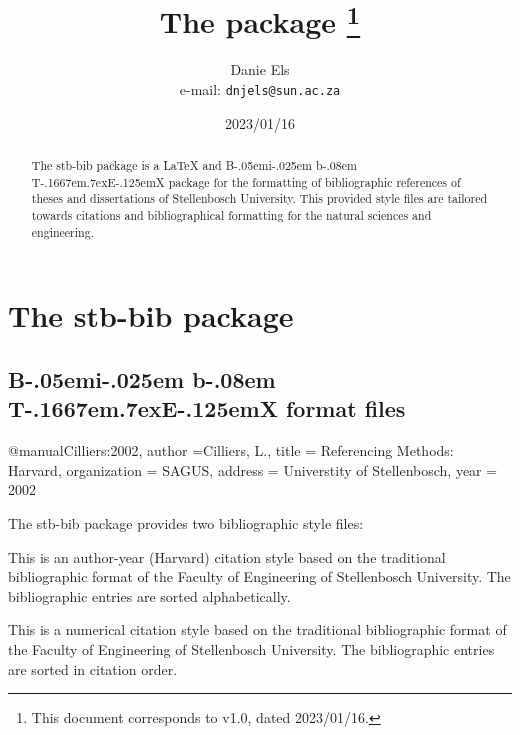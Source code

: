 \documentclass[a4paper,UKenglish]{article}
\title{The \STBbib{} package%
      \thanks{This document corresponds to \STBbib{} v1.0, dated 2023/01/16.}}
\author{Danie Els\\[1ex]
        \normalsize e-mail: \texttt{dnjels@sun.ac.za}}
\date{2023/01/16}
\makeatletter
\newlength{\mytab}
\newcommand*{\@tempfile}{\jobname.tmp}
\newcommand*{\bibfilename}{\jobname}
\def\@BibVerb{%
       \begingroup
          \@bsphack
          \immediate\openout \verbatim@out \@tempfile
          \let\do\@makeother\dospecials\catcode`\^^M\active
          \def\verbatim@processline{%
             \immediate\write\verbatim@out{\the\verbatim@line}%
             \immediate\write\bibtex@out{\the\verbatim@line}}%
          \verbatim@start}
\def\end@BibVerb{%
      \immediate\closeout\verbatim@out\@esphack
      \endgroup}
\newenvironment{BibVerb*}%
      {\@BibVerb}%
      {\end@BibVerb}
\newcommand{\Descriptionlabel}[1]{{#1}{ }\hfil}
\newenvironment{Description}[1][\hspace*{\mytab}]{%
      \list{}{%
         \setlength{\topsep}{\smallskipamount}%
         \setlength{\partopsep}{\z@skip}%
         \setlength{\parsep}{\z@skip}%
         \setlength{\itemsep}{\smallskipamount}%
         \setlength{\itemindent}{0pt}%
         \setlength{\labelsep}{0pt}%
         \settowidth{\labelwidth}{#1}%
         \setlength{\leftmargin}{\labelwidth}%
         \addtolength{\leftmargin}{\labelsep}%
         \addtolength{\leftmargin}{-\itemindent}%
         \let\makelabel\Descriptionlabel}%
      }{\endlist}
\newcommand*{\pkg}[1]{\textsf{#1}}
\def\BibTeX{{\rm B\kern-.05em{\sc i\kern-.025em b}\kern-.08em
    T\kern-.1667em\lower.7ex\hbox{E}\kern-.125emX}}
\newcommand{\STBbib}{\pkg{stb-bib}}
\makeatother
\begin{document}
\maketitle

\nobibliography{\bibfilename}

\begin{abstract}
The \STBbib{} package is a \LaTeX{} and \BibTeX{} package for the formatting of
bibliographic references of theses and dissertations of Stellenbosch University. This provided style files are tailored towards citations and bibliographical
formatting for the natural sciences and engineering.
\end{abstract}


\tableofcontents
\clearpage

\section{The \STBbib{} package}
\subsection{\BibTeX{} format files}

\begin{BibVerb*}
@manual{Cilliers:2002,
   author       ={Cilliers, L.},
   title        = {Referencing Methods: Harvard},
   organization = {\mbox{SAGUS}},
   address      = {Universtity of Stellenbosch},
   year         = {2002}}
\end{BibVerb*}

The \STBbib{} package provides two bibliographic style files:
\begin{Description}
  \item[\normalfont\pkg{stb-bib-eng-a.bst}\footnotemark:~]%
     This is an author-year (Harvard) citation style based on the
     traditional bibliographic format of the Faculty of
     Engineering of Stellenbosch University. The
     bibliographic entries are sorted alphabetically.

  \item[\normalfont\pkg{stb-bib-eng-n.bst}:~]
     This is a numerical citation style based on the
     traditional bibliographic format of the Faculty of
          Engineering of Stellenbosch University. The
     bibliographic entries are sorted in citation order.

\end{Description}
\end{document}
